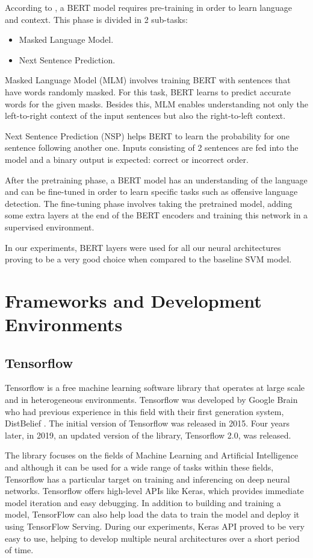 \documentclass[12pt,a4paper]{report}
\begin{document}
According to \citet{devlin2019bert}, a BERT model requires pre-training in order to learn language and context. This phase is divided in 2 sub-tasks: 
\begin{itemize}
    \item Masked Language Model.
    \item Next Sentence Prediction.
\end{itemize}
Masked Language Model (MLM) involves training BERT with sentences that have words randomly masked. For this task, BERT learns to predict accurate words for the given masks. Besides this, MLM enables understanding not only the left-to-right context of the input sentences but also the right-to-left context.

Next Sentence Prediction (NSP) helps BERT to learn the probability for one sentence following another one. Inputs consisting of 2 sentences are fed into the model and a binary output is expected: correct or incorrect order.

After the pretraining phase, a BERT model has an understanding of the language and can be fine-tuned in order to learn specific tasks such as offensive language detection. The fine-tuning phase involves taking the pretrained model, adding some extra layers at the end of the BERT encoders and training this network in a supervised environment.

In our experiments, BERT layers were used for all our neural architectures proving to be a very good choice when compared to the baseline SVM model.

\section{Frameworks and Development Environments}

\subsection{Tensorflow}
Tensorflow \citep{tensorflow2015-whitepaper} is a free machine learning software library that operates at large scale and in heterogeneous environments. Tensorflow was developed by Google Brain who had previous experience in this field with their first generation system, DistBelief \citep{le2013building}. The initial version of Tensorflow was released in 2015. Four years later, in 2019, an updated version of the library, Tensorflow 2.0, was released.

The library focuses on the fields of Machine Learning and Artificial Intelligence and although it can be used for a wide range of tasks within these fields, Tensorflow has a particular target on training and inferencing on deep neural networks.
Tensorflow offers high-level APIs like Keras, which provides immediate model iteration and easy debugging. In addition to building and training a model, TensorFlow can also help load the data to train the model and deploy it using TensorFlow Serving. During our experiments, Keras API proved to be very easy to use, helping to develop multiple neural architectures over a short period of time.
\end{document}
